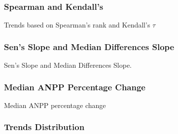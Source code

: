 \documentclass[serif, xcolor={dvipsnames}]{beamer} %
\begin{document}
\begin{frame}
\frametitle{Spearman and Kendall's}
Trends based on Spearman's rank and Kendall's $\tau$
\centering
\end{frame}
\begin{frame}
\frametitle{Sen's Slope and Median Differences Slope}
Sen's Slope and Median Differences Slope.
\begin{center}
\end{center}
\end{frame}
\begin{frame}
\frametitle{Median ANPP Percentage Change}
Median ANPP percentage change
\begin{center}
\end{center}
\end{frame}
\begin{frame}
\frametitle{Trends Distribution}
\begin{center}
\end{center}
\end{frame}

\end{document}
